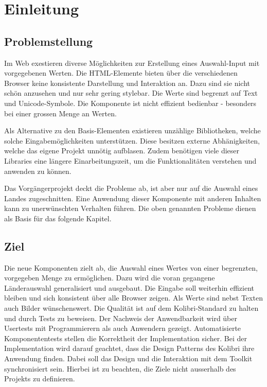\chapter{Einleitung}


\section{Problemstellung}

Im Web exestieren diverse Möglichkeiten zur Erstellung eines Auswahl-Input mit vorgegebenen Werten.
Die HTML-Elemente bieten über die verschiedenen Browser keine konsistente Darstellung und Interaktion an.
Dazu sind sie nicht schön anzusehen und nur sehr gering stylebar. 
Die Werte sind begrenzt auf Text und Unicode-Symbole.
Die Komponente ist nicht effizient bedienbar - besonders bei einer grossen Menge an Werten.

Als Alternative zu den Basis-Elementen existieren unzählige Bibliotheken, welche solche Eingabemöglichkeiten unterstützen.
Diese besitzen externe Abhänigkeiten, welche das eigene Projekt unnötig aufblasen.
Zudem benötigen viele dieser Libraries eine längere Einarbeitungszeit, um die Funktionalitäten verstehen und anwenden zu können.

Das Vorgängerprojekt deckt die Probleme ab, ist aber nur auf die Auswahl eines Landes zugeschnitten.
Eine Anwendung dieser Komponente mit anderen Inhalten kann zu unerwünschten Verhalten führen.
Die oben genannten Probleme dienen als Basis für das folgende Kapitel.


\section{Ziel}

Die neue Komponenten zielt ab, die Auswahl eines Wertes von einer begrenzten, vorgegeben Menge zu ermöglichen.
Dazu wird die voran gegangene Länderauswahl generalisiert und ausgebaut.
Die Eingabe soll weiterhin effizient bleiben und sich konsistent über alle Browser zeigen.
Als Werte sind nebst Texten auch Bilder wünschenswert.
Die Qualität ist auf dem Kolibri-Standard zu halten und durch Tests zu beweisen.
Der Nachweis der Anwendbarkeit wird über Usertests mit Programmierern als auch Anwendern gezeigt.
Automatisierte Komponententests stellen die Korrektheit der Implementation sicher.
Bei der Implementation wird darauf geachtet, dass die Design Patterns des Kolibri ihre Anwendung finden.
Dabei soll das Design und die Interaktion mit dem Toolkit synchronisiert sein.
Hierbei ist zu beachten, die Ziele nicht ausserhalb des Projekts zu definieren.


